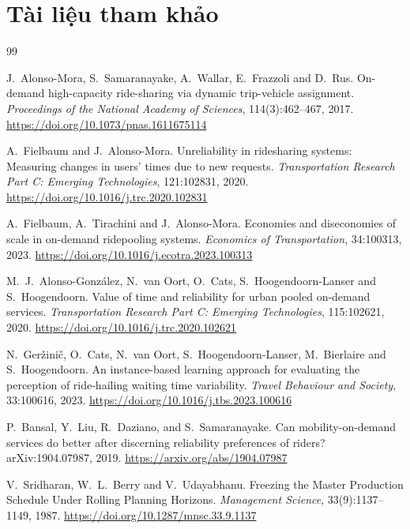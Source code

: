 ﻿\chapter*{Tài liệu tham khảo}

\begin{thebibliography}{99}
\setlength{\itemsep}{5pt}

J.~Alonso-Mora, S.~Samaranayake, A.~Wallar, E.~Frazzoli and D.~Rus.
\newblock On-demand high-capacity ride-sharing via dynamic trip-vehicle assignment.
\newblock \emph{Proceedings of the National Academy of Sciences}, 114(3):462--467, 2017.
\newblock \url{https://doi.org/10.1073/pnas.1611675114}

A.~Fielbaum and J.~Alonso-Mora.
\newblock Unreliability in ridesharing systems: Measuring changes in users’ times due to new requests.
\newblock \emph{Transportation Research Part C: Emerging Technologies}, 121:102831, 2020.
\newblock \url{https://doi.org/10.1016/j.trc.2020.102831}

A.~Fielbaum, A.~Tirachini and J.~Alonso-Mora.
\newblock Economies and diseconomies of scale in on-demand ridepooling systems.
\newblock \emph{Economics of Transportation}, 34:100313, 2023.
\newblock \url{https://doi.org/10.1016/j.ecotra.2023.100313}

M.~J.~Alonso-González, N.~van Oort, O.~Cats, S.~Hoogendoorn-Lanser and S.~Hoogendoorn.
\newblock Value of time and reliability for urban pooled on-demand services.
\newblock \emph{Transportation Research Part C: Emerging Technologies}, 115:102621, 2020.
\newblock \url{https://doi.org/10.1016/j.trc.2020.102621}

N.~Geržinič, O.~Cats, N.~van Oort, S.~Hoogendoorn-Lanser, M.~Bierlaire and S.~Hoogendoorn.
\newblock An instance-based learning approach for evaluating the perception of ride-hailing waiting time variability.
\newblock \emph{Travel Behaviour and Society}, 33:100616, 2023.
\newblock \url{https://doi.org/10.1016/j.tbs.2023.100616}

P.~Bansal, Y.~Liu, R.~Daziano, and S.~Samaranayake.
\newblock Can mobility-on-demand services do better after discerning reliability preferences of
riders?
\newblock arXiv:1904.07987, 2019.
\newblock \url{https://arxiv.org/abs/1904.07987}

V.~Sridharan, W.~L.~Berry and V.~Udayabhanu.
\newblock Freezing the Master Production Schedule Under Rolling Planning Horizons.
\newblock \emph{Management Science}, 33(9):1137--1149, 1987.
\newblock \url{https://doi.org/10.1287/mnsc.33.9.1137}


\end{thebibliography}
